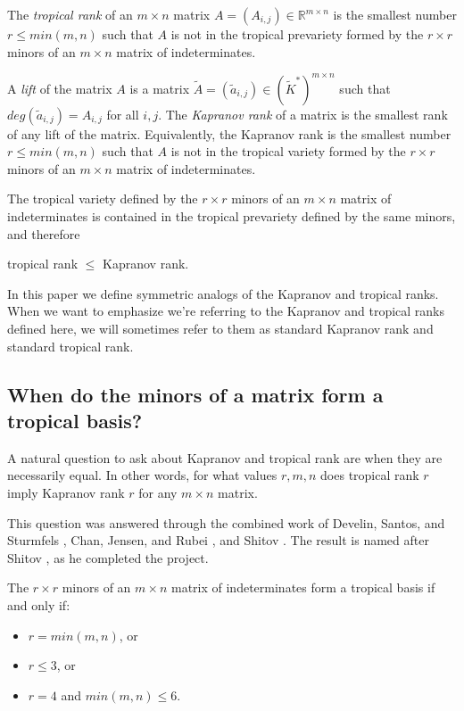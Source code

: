 \documentclass{article}
\begin{document}
The \emph{tropical rank} of an $m \times n$ matrix $A = (A_{i,j}) \in \mathbb{R}^{m \times n}$ is the smallest number $r \leq min(m,n)$ such that $A$ is not in the tropical prevariety formed by the $r \times r$ minors of an $m \times n$ matrix of indeterminates.

A \emph{lift} of the matrix $A$ is a matrix $\tilde{A} = (\tilde{a}_{i,j}) \in (\tilde{K}^{*})^{m \times n}$ such that $deg(\tilde{a}_{i,j}) = A_{i,j}$ for all $i,j$. The \emph{Kapranov rank} of a matrix is the smallest rank of any lift of the matrix. Equivalently, the Kapranov rank is the smallest number $r \leq min(m,n)$ such that $A$ is not in the tropical variety formed by the $r \times r$ minors of an $m \times n$ matrix of indeterminates.

The tropical variety defined by the $r \times r$ minors of an $m \times n$ matrix of indeterminates is contained in the tropical prevariety defined by the same minors, and therefore
\begin{center}
  tropical rank $\leq$ Kapranov rank.
\end{center}

In this paper we define symmetric analogs of the Kapranov and tropical ranks. When we want to emphasize we're referring to the Kapranov and tropical ranks defined here, we will sometimes refer to them as standard Kapranov rank and standard tropical rank.

\subsection{When do the minors of a matrix form a tropical basis?}

A natural question to ask about Kapranov and tropical rank are when they are necessarily equal. In other words, for what values $r,m,n$ does tropical rank $r$ imply Kapranov rank $r$ for any $m \times n$ matrix.

This question was answered through the combined work of Develin, Santos, and Sturmfels \cite{dss}, Chan, Jensen, and Rubei \cite{cjr}, and Shitov \cite{sh2}. The result is named after Shitov \cite{ms}, as he completed the project.

\begin{thm}
  The $r \times r$ minors of an $m \times n$ matrix of indeterminates form a tropical basis if and only if:
  \begin{itemize}
    \item $r = min(m,n)$, or
    \item $r \leq 3$, or
    \item $r = 4$ and $min(m,n) \leq 6$.
  \end{itemize}
\end{thm}
\end{document}
